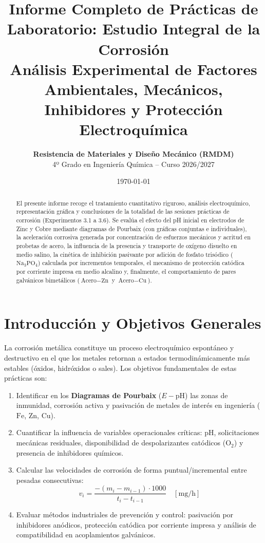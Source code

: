 \documentclass[11pt,a4paper]{article}
\title{\textbf{Informe Completo de Prácticas de Laboratorio: Estudio Integral de la Corrosión}\\[0.4em]\large Análisis Experimental de Factores Ambientales, Mecánicos, Inhibidores y Protección Electroquímica}
\author{\textbf{Resistencia de Materiales y Diseño Mecánico (RMDM)}\\4º Grado en Ingeniería Química -- Curso 2026/2027}
\date{\today}
\begin{document}
\maketitle

\begin{abstract}
El presente informe recoge el tratamiento cuantitativo riguroso, análisis electroquímico, representación gráfica y conclusiones de la totalidad de las sesiones prácticas de corrosión (Experimentos 3.1 a 3.6). Se evalúa el efecto del pH inicial en electrodos de Zinc y Cobre mediante diagramas de Pourbaix (con gráficas conjuntas e individuales), la aceleración corrosiva generada por concentración de esfuerzos mecánicos y acritud en probetas de acero, la influencia de la presencia y transporte de oxígeno disuelto en medio salino, la cinética de inhibición pasivante por adición de fosfato trisódico ($\text{Na}_3\text{PO}_4$) calculada por incrementos temporales, el mecanismo de protección catódica por corriente impresa en medio alcalino y, finalmente, el comportamiento de pares galvánicos bimetálicos ($\text{Acero}-\text{Zn}$ y $\text{Acero}-\text{Cu}$).
\end{abstract}

\tableofcontents
\newpage

\section{Introducción y Objetivos Generales}
La corrosión metálica constituye un proceso electroquímico espontáneo y destructivo en el que los metales retornan a estados termodinámicamente más estables (óxidos, hidróxidos o sales). Los objetivos fundamentales de estas prácticas son:
\begin{enumerate}
    \item Identificar en los \textbf{Diagramas de Pourbaix} ($E-\text{pH}$) las zonas de inmunidad, corrosión activa y pasivación de metales de interés en ingeniería ($\text{Fe}$, $\text{Zn}$, $\text{Cu}$).
    \item Cuantificar la influencia de variables operacionales críticas: pH, solicitaciones mecánicas residuales, disponibilidad de despolarizantes catódicos ($\text{O}_2$) y presencia de inhibidores químicos.
    \item Calcular las velocidades de corrosión de forma puntual/incremental entre pesadas consecutivas:
    \begin{equation}
        v_i = \frac{-(m_i - m_{i-1})\cdot 1000}{t_i - t_{i-1}} \quad [\text{mg/h}]
    \end{equation}
    \item Evaluar métodos industriales de prevención y control: pasivación por inhibidores anódicos, protección catódica por corriente impresa y análisis de compatibilidad en acoplamientos galvánicos.
\end{enumerate}
\end{document}
